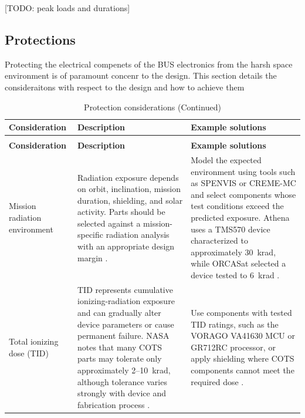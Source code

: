 \documentclass[10pt]{../datasheet}
\let\cite\citep
\begin{document}
  [TODO: peak loads and durations]

\subsection{Protections}

Protecting the electrical compenets of the BUS electronics from the harsh space
environment is of paramount concenr to the design. This section details the
consideraitons with respect to the design and how to achieve them

\renewcommand{\arraystretch}{1.15}
\begin{longtable}{|p{3.5cm}|p{6.5cm}|p{6.5cm}|}
  \caption{Protection considerations} \label{tab:protection_considerations} \\ \hline
  \textbf{Consideration}                       &
  \textbf{Description}                         &
  \textbf{Example solutions}                                                \\ \hline
  \endfirsthead
  \caption[]{Protection considerations (Continued)}                         \\ \hline
  \textbf{Consideration}                       &
  \textbf{Description}                         &
  \textbf{Example solutions}                                                \\ \hline
  \endhead
  \hline
  \endfoot

  Mission radiation environment                &
  Radiation exposure depends on orbit, inclination, mission duration, shielding,
  and solar activity. Parts should be selected against a mission-specific
  radiation analysis with an appropriate design margin
  \cite[pp.~219--220]{nasa_soa_2022}
  \cite[pp.~235--236]{nasa_soa_2023}
  \cite[pp.~240--241]{nasa_soa_2024}
  \cite[pp.~221--222]{nasa_soa_2026}.          &
  Model the expected environment using tools such as SPENVIS \cite{spenvis} or
  CREME-MC \cite{creme_mc} and
  select components whose test conditions exceed the predicted exposure.
  Athena uses a TMS570 device characterized to approximately 30~krad, while
  ORCASat selected a device tested to 6~krad
  \cite{athena_obc_ti_app,athena_obc_ti_prod,orcasat_obc_ds}.               \\ \hline

  Total ionizing dose (TID)                    &
  TID represents cumulative ionizing-radiation exposure and can gradually alter
  device parameters or cause permanent failure. NASA notes that many COTS parts
  may tolerate only approximately 2--10~krad, although tolerance varies strongly
  with device and fabrication process
  \cite[pp.~177--178]{nasa_soa_2022}
  \cite[pp.~191--193]{nasa_soa_2023}
  \cite[pp.~194--196]{nasa_soa_2024}
  \cite[pp.~191--192]{nasa_soa_2026}.          &
  Use components with tested TID ratings, such as the VORAGO VA41630 MCU or
  GR712RC processor, or apply shielding where COTS components cannot meet the
  required dose
  \cite{vorago_va41630,gaisler_gr712rc}.                                    \\ \hline


\end{longtable}
\end{document}
